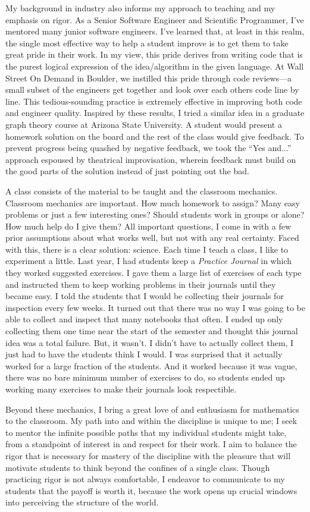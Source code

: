 \documentclass[12pt]{article}
\begin{document}
My background in industry also informs my approach to teaching and my emphasis on rigor. As a Senior Software Engineer and Scientific Programmer, 
I've mentored many junior software engineers. I've learned that, at least in this realm, the single most effective way to help a student improve is to 
get them to take great pride in their work. In my view, this pride derives from writing code that is the purest logical expression of the idea/algorithm in the
 given language. At Wall Street On Demand in Boulder, we instilled this pride through code reviews---a small subset of the engineers get together and look over
 each others code line by line.  This tedious-sounding practice is extremely effective in improving both code and engineer quality. Inspired by these results, 
 I tried a similar idea in a graduate graph theory course at Arizona State University. A student would present a homework solution on the board and the rest of the class 
 would give feedback.  To prevent progress being quashed by negative feedback, we took the ``Yes and...'' approach espoused by theatrical improvisation, wherein feedback 
 must build on the good parts of the solution instead of just pointing out the bad.
 
A class consists of the material to be taught and the classroom mechanics. Classroom mechanics are important.  
How much homework to assign? Many easy problems or just a few interesting ones? Should students work in groups or alone? How much help do I give them?
All important questions, I come in with a few prior assumptions about what works well, but not with any real certainty.  Faced with this, there is a clear solution: science.
Each time I teach a class, I like to experiment a little.  Last year, I had students keep a \emph{Practice Journal} in which they worked suggested exercises.  
I gave them a large list of exercises of each type and instructed them to keep working problems in their journals until they became easy.  I told the students that I would
be collecting their journals for inspection every few weeks.  It turned out that there was no way I was going to be able to collect and inspect that many notebooks that often.
I ended up only collecting them one time near the start of the semester and thought this journal idea was a total failure. But, it wasn't.  I didn't have to actually collect them,
I just had to have the students think I would. I was surprised that it actually worked for a large fraction of the students.  And it worked because it was vague, there
was no bare minimum number of exercises to do, so students ended up working many exercises to make their journals look respectible.
 
Beyond these mechanics, I bring a great love of and enthusiasm for mathematics to the classroom. 
My path into and within the discipline is unique to me; I seek to mentor the infinite possible paths that my individual students might take, 
from a standpoint of interest in and respect for their work. I aim to balance the rigor that is necessary for mastery of the discipline with the pleasure 
that will motivate students to think beyond the confines of a single class. Though practicing rigor is not always comfortable, I endeavor to communicate to
my students that the payoff is worth it, because the work opens up crucial windows into perceiving the structure of the world. 
\end{document}
